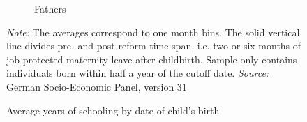\documentclass[a4paper ]{article}
\begin{document}
\begin{figure}[h]
\begin{subfigure}[t]{0.48\textwidth}
		\caption{Fathers}
	\end{subfigure}
	\caption{Average years of schooling by date of child's birth}\label{fig:yrschooling_parents_treated cohorts}
	\begin{minipage}{\textwidth} %
{\footnotesize \textit{Note:} The averages correspond to one month bins. The solid vertical line divides pre- and post-reform time span, i.e. two or six months of job-protected maternity leave after childbirth. Sample only contains individuals born within half a year of the cutoff date. \newline \textit{Source: }German Socio-Economic Panel, version 31\par}
\end{minipage}
\end{figure}
\vspace*{\fill}











\clearpage
\end{document}
